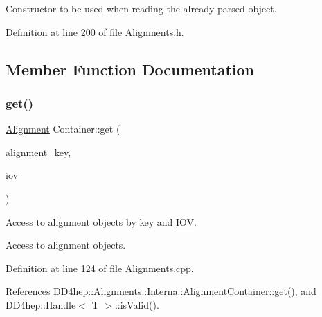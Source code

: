 Constructor to be used when reading the already parsed object. 



Definition at line 200 of file Alignments.\+h.



\subsection{Member Function Documentation}
\hypertarget{class_d_d4hep_1_1_alignments_1_1_container_a35cc0038316885f30fb1cf68c234ef41}{}\label{class_d_d4hep_1_1_alignments_1_1_container_a35cc0038316885f30fb1cf68c234ef41} 
\subsubsection{\texorpdfstring{get()}{get()}\hspace{0.1cm}{\footnotesize\ttfamily [1/4]}}
{\footnotesize\ttfamily \hyperlink{class_d_d4hep_1_1_alignments_1_1_alignment}{Alignment} Container\+::get (\begin{DoxyParamCaption}\item[{const std\+::string \&}]{alignment\+\_\+key,  }\item[{const \hyperlink{class_d_d4hep_1_1_alignments_1_1_container_a0da2fec1e4433deea86defda82886128}{iov\+\_\+type} \&}]{iov }\end{DoxyParamCaption})}



Access to alignment objects by key and \hyperlink{class_d_d4hep_1_1_i_o_v}{I\+OV}. 

Access to alignment objects. 

Definition at line 124 of file Alignments.\+cpp.



References D\+D4hep\+::\+Alignments\+::\+Interna\+::\+Alignment\+Container\+::get(), and D\+D4hep\+::\+Handle$<$ T $>$\+::is\+Valid().

\hypertarget{class_d_d4hep_1_1_alignments_1_1_container_a9ce366840ca326bf5258e6ac94537048}{}\label{class_d_d4hep_1_1_alignments_1_1_container_a9ce366840ca326bf5258e6ac94537048} 
